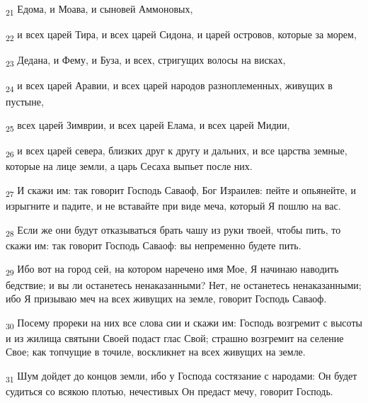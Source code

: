 \begin{tcolorbox}
\textsubscript{21} Едома, и Моава, и сыновей Аммоновых,
\end{tcolorbox}
\begin{tcolorbox}
\textsubscript{22} и всех царей Тира, и всех царей Сидона, и царей островов, которые за морем,
\end{tcolorbox}
\begin{tcolorbox}
\textsubscript{23} Дедана, и Фему, и Буза, и всех, стригущих волосы на висках,
\end{tcolorbox}
\begin{tcolorbox}
\textsubscript{24} и всех царей Аравии, и всех царей народов разноплеменных, живущих в пустыне,
\end{tcolorbox}
\begin{tcolorbox}
\textsubscript{25} всех царей Зимврии, и всех царей Елама, и всех царей Мидии,
\end{tcolorbox}
\begin{tcolorbox}
\textsubscript{26} и всех царей севера, близких друг к другу и дальних, и все царства земные, которые на лице земли, а царь Сесаха выпьет после них.
\end{tcolorbox}
\begin{tcolorbox}
\textsubscript{27} И скажи им: так говорит Господь Саваоф, Бог Израилев: пейте и опьянейте, и изрыгните и падите, и не вставайте при виде меча, который Я пошлю на вас.
\end{tcolorbox}
\begin{tcolorbox}
\textsubscript{28} Если же они будут отказываться брать чашу из руки твоей, чтобы пить, то скажи им: так говорит Господь Саваоф: вы непременно будете пить.
\end{tcolorbox}
\begin{tcolorbox}
\textsubscript{29} Ибо вот на город сей, на котором наречено имя Мое, Я начинаю наводить бедствие; и вы ли останетесь ненаказанными? Нет, не останетесь ненаказанными; ибо Я призываю меч на всех живущих на земле, говорит Господь Саваоф.
\end{tcolorbox}
\begin{tcolorbox}
\textsubscript{30} Посему прореки на них все слова сии и скажи им: Господь возгремит с высоты и из жилища святыни Своей подаст глас Свой; страшно возгремит на селение Свое; как топчущие в точиле, воскликнет на всех живущих на земле.
\end{tcolorbox}
\begin{tcolorbox}
\textsubscript{31} Шум дойдет до концов земли, ибо у Господа состязание с народами: Он будет судиться со всякою плотью, нечестивых Он предаст мечу, говорит Господь.
\end{tcolorbox}
